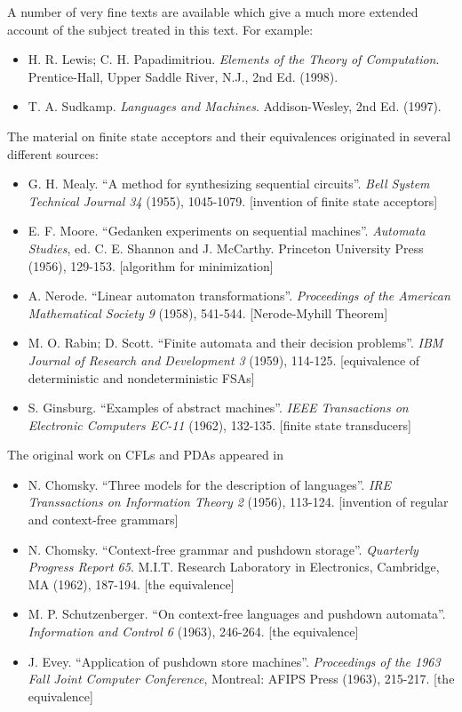 \documentclass{article}
\begin{document}
A number of very fine texts are available which give a much more extended account of the subject treated in this text. For example:
\begin{itemize}
  \item H. R. Lewis; C. H. Papadimitriou. \emph{Elements of the Theory of Computation}. Prentice-Hall, Upper Saddle River, N.J., 2nd Ed. (1998).
  \item T. A. Sudkamp. \emph{Languages and Machines}. Addison-Wesley, 2nd Ed. (1997).
\end{itemize}
The material on finite state acceptors and their equivalences originated in several different sources:
\begin{itemize}
  \item G. H. Mealy. ``A method for synthesizing sequential circuits''. \emph{Bell System Technical Journal 34} (1955), 1045-1079. [invention of finite state acceptors]
  \item E. F. Moore. ``Gedanken experiments on sequential machines''. \emph{Automata Studies}, ed. C. E. Shannon and J. McCarthy. Princeton University Press (1956), 129-153. [algorithm for minimization]
  \item A. Nerode. ``Linear automaton transformations''. \emph{Proceedings of the American Mathematical Society 9} (1958), 541-544. [Nerode-Myhill Theorem]
  \item M. O. Rabin; D. Scott. ``Finite automata and their decision problems''. \emph{IBM Journal of Research and Development 3} (1959), 114-125. [equivalence of deterministic and nondeterministic FSAs]
  \item S. Ginsburg. ``Examples of abstract machines''. \emph{IEEE Transactions on Electronic Computers EC-11} (1962), 132-135. [finite state transducers]
\end{itemize}
The original work on CFLs and PDAs appeared in
\begin{itemize}
  \item N. Chomsky. ``Three models for the description of languages''. \emph{IRE Transsactions on Information Theory 2} (1956), 113-124. [invention of regular and context-free grammars]
  \item N. Chomsky. ``Context-free grammar and pushdown storage''. \emph{Quarterly Progress Report 65}. M.I.T. Research Laboratory in Electronics, Cambridge, MA (1962), 187-194. [the equivalence]
  \item M. P. Schutzenberger. ``On context-free languages and pushdown automata''. \emph{Information and Control 6} (1963), 246-264. [the equivalence]
  \item J. Evey. ``Application of pushdown store machines''. \emph{Proceedings of the 1963 Fall Joint Computer Conference}, Montreal: AFIPS Press (1963), 215-217. [the equivalence]
\end{itemize}
\end{document}
